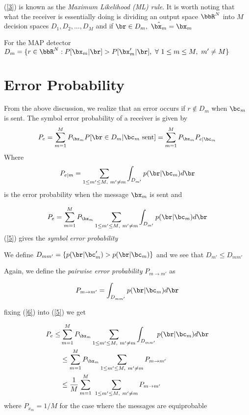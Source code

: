\documentclass[11pt, oneside, dvipdfmx]{book}
\begin{document}
(\ref{3}) is known as the \textit{Maximum Likelihood (ML) rule}. It is worth noting that what the receiver is essentially doing is dividing an output space $\bbR^N$ into $M$ decision spaces $D_1,D_2,...,D_M$ and if $\br \in D_m,~\hat{\bx_m} = \bx_m$ 

For the MAP detector $D_m=\{r \in \bbR^N : P[\bx_m|\br] > P[\bx_m'|\br],~\forall~ 1 \leq m \leq M,~m' \neq M \}$

\section{Error Probability}
From the above discussion, we realize that an error occurs if $r \notin D_m$ when $\bc_m$ is sent. The symbol error probability of a receiver is given by
\begin{equation}
P_e = \sum_{m=1}^{M} P_{\bx_m} P[\br \in D_m | \bc_m ~\text{sent}] = \sum_{m=1}^{M} P_{\bx_m} P_{e|\bc_m}
\end{equation}
Where $$P_{e|m} = \sum_{1 \leq m' \leq M,~m'\neq m}^{} \int_{D_{m'}} p(\br|\bc_{m})d\br$$ is the error probability when the message $\bx_m$ is sent and 

\begin{equation}
P_e = \sum_{m=1}^{M} P_{\bx_m} \sum_{1 \leq m' \leq M,~m'\neq m}^{} \int_{D_{m'}} p(\br|\bc_{m})d\br
\label{5}
\end{equation}
(\ref{5}) gives the \textit{symbol error probability}

We define $D_{mm'} =\{ p(\br|\bc_m') > p(\br|\bc_m) \}$  and we see that $D_{m'} \leq D_{mm'}$

Again, we define the \textit{pairwise error probability} $P_{m \rightarrow m'}$ as 

\begin{equation}
P_{m \rightarrow m'}= \int_{D_{mm'}} p(\br|\bc_{m})d\br
\label{6}
\end{equation}

fixing (\ref{6}) into (\ref{5}) we get 

\begin{equation}
\begin{split}
P_e \leq & \sum_{m=1}^{M} P_{\bx_m} \sum_{1 \leq m' \leq M,~m'\neq m}^{} \int_{D_{mm'}} p(\br|\bc_{m})d\br\\
& \leq \sum_{m=1}^{M} P_{\bx_m} \sum_{1 \leq m' \leq M,~m'\neq m}^{}P_{m \rightarrow m'}\\
& \leq \frac{1}{M}\sum_{m=1}^{M}~  \sum_{1 \leq m' \leq M,~m'\neq m}^{}P_{m \rightarrow m'}\\
\end{split}
\label{7}
\end{equation}
where $P_{x_m}=1/M$ for the case where the messages are equiprobable
\end{document}
